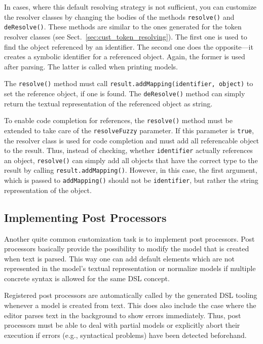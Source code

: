 In cases, where this default resolving strategy is not sufficient, you can
customize the resolver classes by changing the bodies of the methods
\texttt{resolve()} and \texttt{deResolve()}. These methods are similar to the
ones generated for the token resolver classes (see
Sect.~\ref{sec:cust_token_resolving}). The first one is used to find the object
referenced by an identifier. The second one does the opposite---it creates a
symbolic identifier for a referenced object. Again, the former is used after
parsing. The latter is called when printing models.

The \texttt{resolve()} method must call \texttt{result.addMapping(identifier,
object)} to set the reference object, if one is found. The
\texttt{deResolve()} method can simply return the textual representation of the
referenced object as string.

To enable code completion for references, the \texttt{resolve()} method must be
extended to take care of the \texttt{resolveFuzzy} parameter. If this parameter is
\texttt{true}, the resolver class is used for code completion and must add all
referencable object to the result. Thus, instead of checking, whether
\texttt{identifier} actually references an object, \texttt{resolve()} can
simply add all objects that have the correct type to the result by calling
\texttt{result.addMapping()}. However, in this case, the first argument, which
is passed to \texttt{addMapping()} should not be \texttt{identifier}, but rather
the string representation of the object.

\subsection{Implementing Post Processors}
\label{sec:cust_post_processors}

Another quite common customization task is to implement post processors. Post
processors basically provide the possibility to modify the model that is
created when text is parsed. This way one can add default elements which are not
represented in the model's textual representation or normalize models if
multiple concrete syntax is allowed for the same DSL concept.

Registered post processors are automatically called by the generated DSL tooling
whenever a model is created from text. This does also include the case where the
editor parses text in the background to show errors immediately. Thus, post
processors must be able to deal with partial models or explicitly abort their
execution if errors (e.g., syntactical problems) have been detected beforehand.

